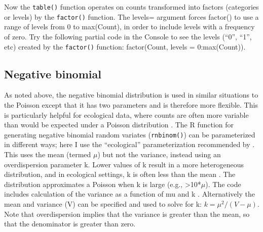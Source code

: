 \documentclass[
]{krantz}
\begin{document}
Now the \texttt{table()} function operates on counts transformed into factors (categories or levels) by the \texttt{factor()} function. The levels= argument forces factor() to use a range of levels from 0 to max(Count), in order to include levels with a frequency of zero. Try the following partial code in the Console to see the levels (``0'', ``1'', etc) created by the \texttt{factor()} function: factor(Count, levels = 0:max(Count)).

\hypertarget{NegBinom}{%
\subsection{Negative binomial}\label{NegBinom}}

As noted above, the negative binomial distribution is used in similar situations to the Poisson except that it has two parameters and is therefore more flexible. This is particularly helpful for ecological data, where counts are often more variable than would be expected under a Poisson distribution \citep{bolker2008, link.barker_2010}. The R function for generating negative binomial random variates (\texttt{rnbinom()}) can be parameterized in different ways; here I use the ``ecological'' parameterization recommended by \citet{bolker2008}. This uses the mean (termed \(\mu\)) but not the variance, instead using an overdispersion parameter k. Lower values of k result in a more heterogeneous distribution, and in ecological settings, k is often less than the mean \citep{bolker2008}. The distribution approximates a Poisson when k is large (e.g., \textgreater10*\(\mu\)). The code includes calculation of the variance as a function of mu and k \citep{bolker2008}. Alternatively the mean and variance (V) can be specified and used to solve for k: \(k = \mu^2/(V-\mu)\). Note that overdispersion implies that the variance is greater than the mean, so that the denominator is greater than zero.
\end{document}
